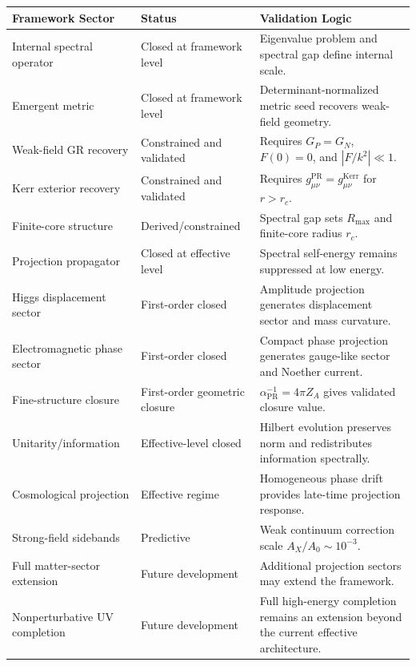 \documentclass[11pt]{article}
\newcommand{\PR}{\mathrm{PR}}
\newcommand{\Kerr}{\mathrm{Kerr}}
\begin{document}
\begin{longtable}{>{\raggedright\arraybackslash}p{}
>{\raggedright\arraybackslash}p{}
>{\raggedright\arraybackslash}p{}}
\toprule
\textbf{Framework Sector} & \textbf{Status} & \textbf{Validation Logic} \\
\midrule
\endhead

Internal spectral operator & Closed at framework level & Eigenvalue problem and spectral gap define internal scale. \\

Emergent metric & Closed at framework level & Determinant-normalized metric seed recovers weak-field geometry. \\

Weak-field GR recovery & Constrained and validated & Requires $G_P=G_N$, $F(0)=0$, and $|F/k^2|\ll1$. \\

Kerr exterior recovery & Constrained and validated & Requires $g_{\mu\nu}^{\PR}=g_{\mu\nu}^{\Kerr}$ for $r>r_c$. \\

Finite-core structure & Derived/constrained & Spectral gap sets $R_{\max}$ and finite-core radius $r_c$. \\

Projection propagator & Closed at effective level & Spectral self-energy remains suppressed at low energy. \\

Higgs displacement sector & First-order closed & Amplitude projection generates displacement sector and mass curvature. \\

Electromagnetic phase sector & First-order closed & Compact phase projection generates gauge-like sector and Noether current. \\

Fine-structure closure & First-order geometric closure & $\alpha_{\PR}^{-1}=4\pi Z_A$ gives validated closure value. \\

Unitarity/information & Effective-level closed & Hilbert evolution preserves norm and redistributes information spectrally. \\

Cosmological projection & Effective regime & Homogeneous phase drift provides late-time projection response. \\

Strong-field sidebands & Predictive & Weak continuum correction scale $A_X/A_0\sim10^{-3}$. \\

Full matter-sector extension & Future development & Additional projection sectors may extend the framework. \\

Nonperturbative UV completion & Future development & Full high-energy completion remains an extension beyond the current effective architecture. \\

\bottomrule
\end{longtable}
\end{document}
